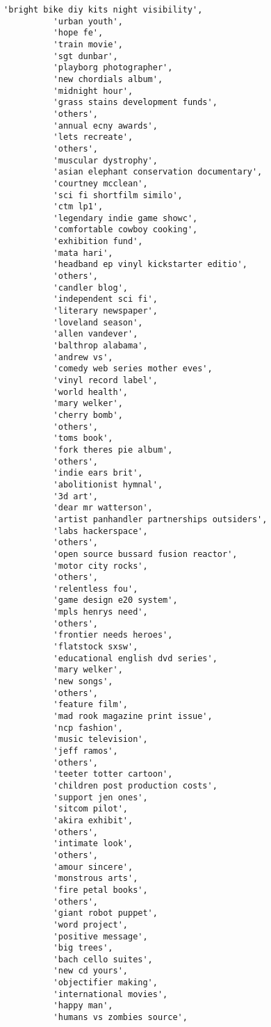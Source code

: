 \documentclass[11pt]{article}
\begin{document}
\begin{Verbatim}[commandchars=\\\{\}]
          'bright bike diy kits night visibility',
          'urban youth',
          'hope fe',
          'train movie',
          'sgt dunbar',
          'playborg photographer',
          'new chordials album',
          'midnight hour',
          'grass stains development funds',
          'others',
          'annual ecny awards',
          'lets recreate',
          'others',
          'muscular dystrophy',
          'asian elephant conservation documentary',
          'courtney mcclean',
          'sci fi shortfilm similo',
          'ctm lp1',
          'legendary indie game showc',
          'comfortable cowboy cooking',
          'exhibition fund',
          'mata hari',
          'headband ep vinyl kickstarter editio',
          'others',
          'candler blog',
          'independent sci fi',
          'literary newspaper',
          'loveland season',
          'allen vandever',
          'balthrop alabama',
          'andrew vs',
          'comedy web series mother eves',
          'vinyl record label',
          'world health',
          'mary welker',
          'cherry bomb',
          'others',
          'toms book',
          'fork theres pie album',
          'others',
          'indie ears brit',
          'abolitionist hymnal',
          '3d art',
          'dear mr watterson',
          'artist panhandler partnerships outsiders',
          'labs hackerspace',
          'others',
          'open source bussard fusion reactor',
          'motor city rocks',
          'others',
          'relentless fou',
          'game design e20 system',
          'mpls henrys need',
          'others',
          'frontier needs heroes',
          'flatstock sxsw',
          'educational english dvd series',
          'mary welker',
          'new songs',
          'others',
          'feature film',
          'mad rook magazine print issue',
          'ncp fashion',
          'music television',
          'jeff ramos',
          'others',
          'teeter totter cartoon',
          'children post production costs',
          'support jen ones',
          'sitcom pilot',
          'akira exhibit',
          'others',
          'intimate look',
          'others',
          'amour sincere',
          'monstrous arts',
          'fire petal books',
          'others',
          'giant robot puppet',
          'word project',
          'positive message',
          'big trees',
          'bach cello suites',
          'new cd yours',
          'objectifier making',
          'international movies',
          'happy man',
          'humans vs zombies source',

\end{Verbatim}
\end{document}
